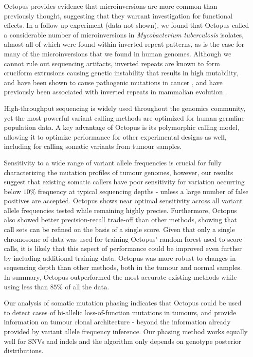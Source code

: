 \documentclass[notitlepage, twocolumn, 10pt]{article}
\begin{document}
Octopus provides evidence that microinversions are more common than previously thought, suggesting that they warrant investigation for functional effects. In a follow-up experiment (data not shown), we found that Octopus called a considerable number of microinversions in \textit{Mycobacterium tuberculosis} isolates, almost all of which were found within inverted repeat patterns, as is the case for many of the microinversions that we found in human genomes. Although we cannot rule out sequencing artifacts, inverted repeats are known to form cruciform extrusions causing genetic instability that results in high mutability, and have been shown to cause pathogenic mutations in cancer \cite{RN615}, and have previously been associated with inverted repeats in mammalian evolution \cite{RN561, RN618}.

High-throughput sequencing is widely used throughout the genomics community, yet the most powerful variant calling methods are optimized for human germline population data. A key advantage of Octopus is its polymorphic calling model, allowing it to optimize performance for other experimental designs as well, including for calling somatic variants from tumour samples.

Sensitivity to a wide range of variant allele frequencies is crucial for fully characterizing the mutation profiles of tumour genomes, however, our results suggest that existing somatic callers have poor sensitivity for variation occurring below $10\%$ frequency at typical sequencing depths - unless a large number of false positives are accepted. Octopus shows near optimal sensitivity across all variant allele frequencies tested while remaining highly precise. Furthermore, Octopus also showed better precision-recall trade-off than other methods, showing that call sets can be refined on the basis of a single score. Given that only a single chromosome of data was used for training Octopus' random forest used to score calls, it is likely that this aspect of performance could be improved even further by including additional training data. Octopus was more robust to changes in sequencing depth than other methods, both in the tumour and normal samples. In summary, Octopus outperformed the most accurate existing methods while using less than $85\%$ of all the data.

Our analysis of somatic mutation phasing indicates that Octopus could be used to detect cases of bi-allelic loss-of-function mutations in tumours, and provide information on tumour clonal architecture - beyond the information already provided by variant allele frequency inference. Our phasing method works equally well for SNVs and indels and the algorithm only depends on genotype posterior distributions.
\end{document}

